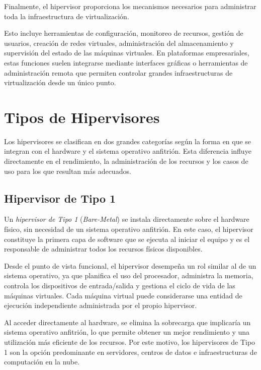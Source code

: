 Finalmente, el hipervisor proporciona los mecanismos necesarios para administrar toda la infraestructura de virtualización.

Esto incluye herramientas de configuración, monitoreo de recursos, gestión de usuarios, creación de redes virtuales, administración del almacenamiento y supervisión del estado de las máquinas virtuales. En plataformas empresariales, estas funciones suelen integrarse mediante interfaces gráficas o herramientas de administración remota que permiten controlar grandes infraestructuras de virtualización desde un único punto.

\section{Tipos de Hipervisores}

Los hipervisores se clasifican en dos grandes categorías según la forma en que se integran con el hardware y el sistema operativo anfitrión. Esta diferencia influye directamente en el rendimiento, la administración de los recursos y los casos de uso para los que resultan más adecuados.

\subsection{Hipervisor de Tipo 1}

Un \textit{hipervisor de Tipo 1} (\textit{Bare-Metal}) se instala directamente sobre el hardware físico, sin necesidad de un sistema operativo anfitrión. En este caso, el hipervisor constituye la primera capa de software que se ejecuta al iniciar el equipo y es el responsable de administrar todos los recursos físicos disponibles.

Desde el punto de vista funcional, el hipervisor desempeña un rol similar al de un sistema operativo, ya que planifica el uso del procesador, administra la memoria, controla los dispositivos de entrada/salida y gestiona el ciclo de vida de las máquinas virtuales. Cada máquina virtual puede considerarse una entidad de ejecución independiente administrada por el propio hipervisor.

Al acceder directamente al hardware, se elimina la sobrecarga que implicaría un sistema operativo anfitrión, lo que permite obtener un mejor rendimiento y una utilización más eficiente de los recursos. Por este motivo, los hipervisores de Tipo 1 son la opción predominante en servidores, centros de datos e infraestructuras de computación en la nube.

